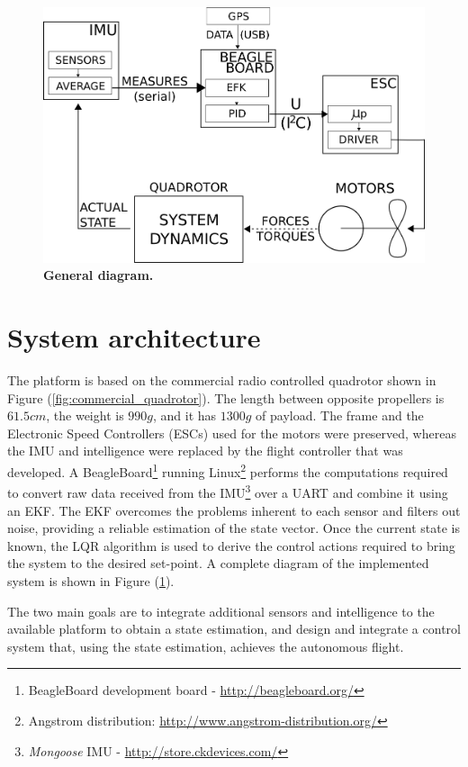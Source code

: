 \documentclass[conference]{IEEEtran}
\newcommand{\refp}[1]{(\ref{#1})}
\begin{document}
\begin{figure}[h!]
\vspace{-.3cm}
	\centering
	\includegraphics[width=.8\columnwidth]{./pics_paper/diagrama_general.png}
	\caption{\textbf{General diagram.}}
	\label{fig:diagrama_tio}
\end{figure}

\section{System architecture}
The platform is based on the commercial radio controlled quadrotor shown in Figure \refp{fig:commercial_quadrotor}. The length between opposite propellers is $61.5cm$, the weight is $990g$, and it has $1300g$ of payload. The frame and the Electronic Speed Controllers (ESCs) used for the motors were preserved, whereas the IMU and intelligence were replaced by the flight controller that was developed. A BeagleBoard\footnote{BeagleBoard development board - \url{http://beagleboard.org/}} running Linux\footnote{Angstrom distribution: \url{http://www.angstrom-distribution.org/}} performs the computations required to convert raw data received from the IMU\footnote{\textit{Mongoose} IMU - \url{http://store.ckdevices.com/}} over a UART and combine it using an EKF. The EKF overcomes the problems inherent to each sensor and filters out noise, providing a reliable estimation of the state vector. Once the current state is known, the LQR algorithm is used to derive the control actions required to bring the system to the desired set-point. A complete diagram of the implemented system is shown in Figure \refp{fig:diagrama_tio}.

 
The two main goals are to integrate additional sensors and intelligence to the available platform to obtain a state estimation, and design and integrate a control system that, using the state estimation, achieves the autonomous flight.
\end{document}
